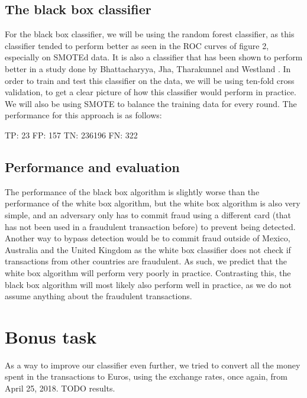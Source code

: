 \documentclass[]{article}
\begin{document}
\subsection{The black box classifier}
For the black box classifier, we will be using the random forest classifier, as this classifier tended to perform better as seen in the ROC curves of figure 2, especially on SMOTEd data. It is also a classifier that has been shown to perform better in a study done by Bhattacharyya, Jha, Tharakunnel and Westland \cite{bhattacharyya2011data}. In order to train and test this classifier on the data, we will be using ten-fold cross validation, to get a clear picture of how this classifier would perform in practice. We will also be using SMOTE to balance the training data for every round. The performance for this approach is as follows:

\begin{flushleft}
	TP: 23 \newline
	FP: 157  \newline
	TN: 236196 \newline
	FN: 322 \newline
\end{flushleft}
\subsection{Performance and evaluation}
The performance of the black box algorithm is slightly worse than the performance of the white box algorithm, but the white box algorithm is also very simple, and an adversary only has to commit fraud using a different card (that has not been used in a fraudulent transaction before) to prevent being detected. Another way to bypass detection would be to commit fraud outside of Mexico, Australia and the United Kingdom as the white box classifier does not check if transactions from other countries are fraudulent. As such, we predict that the white box algorithm will perform very poorly in practice. Contrasting this, the black box algorithm will most likely also perform well in practice, as we do not assume anything about the fraudulent transactions.
\clearpage
\section{Bonus task}
As a way to improve our classifier even further, we tried to convert all the money spent in the transactions to Euros, using the exchange rates, once again, from April 25, 2018. TODO results.
\end{document}
